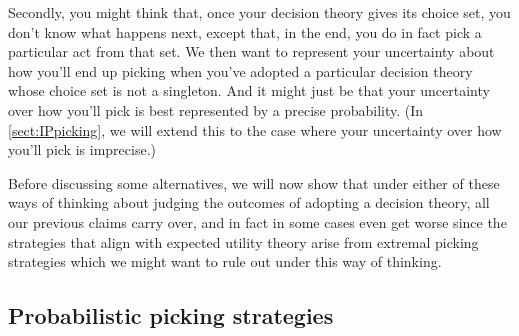 \documentclass[a4paper]{article}
\newcommand\Exp{\mathsf{Exp}}
\newcommand\U{\mathfrak{U}} %
\newcommand{\n}{\mathsf{n}}
\newcommand{\todoold}[2][]{\todo[backgroundcolor=white,bordercolor=orange!10,linecolor=gray!10, #1,caption={},textcolor=gray]{Pre-rev: #2}}
\newenvironment{CCM rewritten}
{\begingroup\color{blue}} %
{\endgroup}              %
\begin{document}
Secondly, you might think that, once your decision theory gives its choice set, you don't know what happens next, except that, in the end, you do in fact pick a particular act from that set. We then want to represent your uncertainty about how you'll end up picking when you've adopted a particular decision theory whose choice set is not a singleton. And it might just be that your uncertainty over how you'll pick is best represented by a precise probability. (In \cref{sect:IPpicking}, we will extend this to the case where your uncertainty over how you'll pick is imprecise.)



Before discussing some alternatives, we will now show that under either of these ways of thinking about judging the outcomes of adopting a decision theory, all our previous claims carry over, and in fact in some cases even get worse since the strategies that align with expected utility theory arise from extremal picking strategies which we might want to rule out under this way of thinking. 






\subsection{Probabilistic picking strategies}
\end{document}
